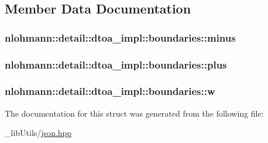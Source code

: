 \subsection{Member Data Documentation}
\subsubsection[{\texorpdfstring{minus}{minus}}]{ nlohmann\+::detail\+::dtoa\+\_\+impl\+::boundaries\+::minus}\hypertarget{structnlohmann_1_1detail_1_1dtoa__impl_1_1boundaries_aec4e5028333c01f3229062f31ce16763}{}\label{structnlohmann_1_1detail_1_1dtoa__impl_1_1boundaries_aec4e5028333c01f3229062f31ce16763}
\subsubsection[{\texorpdfstring{plus}{plus}}]{ nlohmann\+::detail\+::dtoa\+\_\+impl\+::boundaries\+::plus}\hypertarget{structnlohmann_1_1detail_1_1dtoa__impl_1_1boundaries_a3321ae2816a6ec5250a0d8e29f798232}{}\label{structnlohmann_1_1detail_1_1dtoa__impl_1_1boundaries_a3321ae2816a6ec5250a0d8e29f798232}
\subsubsection[{\texorpdfstring{w}{w}}]{ nlohmann\+::detail\+::dtoa\+\_\+impl\+::boundaries\+::w}\hypertarget{structnlohmann_1_1detail_1_1dtoa__impl_1_1boundaries_ad1668c60aeade5f2557fafed8b8aee1a}{}\label{structnlohmann_1_1detail_1_1dtoa__impl_1_1boundaries_ad1668c60aeade5f2557fafed8b8aee1a}


The documentation for this struct was generated from the following file\+:\begin{DoxyCompactItemize}
\item 
\+\_\+lib\+Utils/\hyperlink{json_8hpp}{json.\+hpp}\end{DoxyCompactItemize}
